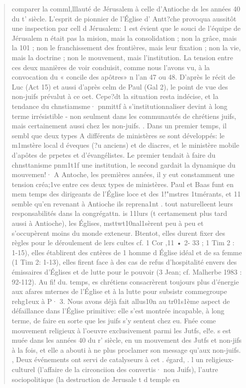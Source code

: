 \begin{quote}
    comparer la comml,lllauté de Jérusalem à celle d'Antioche ds les
années 40 du t' siècle. L'esprit de pionnier de l'Église d' Antt?che
provoqua aussitôt une inspection par cell d Jérusalem: 1 est évient
que le souci de l'équipe de Jérusalem n était pas la mision, mais la
consolidation ; non la grâce, mais la 101 ; non le franchissement des
frontières, mais leur fixation ; non la vie, mais la doctrine ; non le
mouvement, mais l'institution.
La tension entre ces deux manières de voir conduisit, comme nous
l'avons vu, à la convocation du « concile des apôtres» n l'an 47 ou
48. D'après le récit de Luc (Act 15) et aussi d'après celm de Paul (Gal
2), le point de vue des non-juifs prévalut à ce oet. Cepe?dt la
situation resta indécise, et la tendance du chnstiamsme· pnmittf à
s'institutionnaliser devint à long terme irrésistible - non seulment
dans les communautés de chrétiens juifs, mais certainement aussi chez
les non-juifs. .
Dans un premier temps, il sembl que deux types A différents de
ministères se sont développés: le m1mstère local d éveques (?u anciens)
et de diacres, et le ministère mobile d'apôtes de prpetes et
d'évangélistes. Le premier tendait à faire du chnsttanisme pnm1t1f une
institution, le second gardait la dynamique du mouvemen!· A Antoche,
les premières années, il y eut constamment une tension créa;1ve
entre ces deux types de ministères. Paul et Baas funt en mem
temps des dirigeants de l'Église loce et des 1!"mstres 1tmérants, et 11
semble qu'en revenant à Antioche ils reprena1nt . tout naturelleent
leurs responsabilités dans la congrégattn. is 11lurs (t certamement
plus tard aussi à Antioche), les Églises,  msttwt10nal1sèrent peu
à peu et s'occupèrent moins du monde exteneur. Btentot, elles durent
fixer des règles pour le déroulement de lers cultes cf. 1 Cor ,11 • 2-
33 ; 1 Tim 2 : 1-15), elles établirent des cntères de 1 homme d Église
idéal et de sa femme (1 Tim 2: 1-13), elles firent face à des cas de
refus d'hospitalité envers des émissaires d'Églises et de lutte pour le
pouvoir (3 Jean; cf. Malherbe 1983 : 92-112). Au fi! du. temps, es
chrétiens consacrèrent toujours plus d'énergie aux afares mternes de
l'Église et à la lutte pour subsistr commegroupe rehg1eux à P·
3. Nous avons déjà fait allus10n au tr01s1ème aspect de défaillance
dans l'Église primitive: elle s'est montrée incapable, à long terme, de
faire en sorte que les juifs s'y sentent chez eu. Fnée come
mouvement religieux à l'oeuvre exclusivement parmi les Jutfs, el!e. s est
muée dans les années 40 du r' siècle, en un mouvement des Jutfs et
non-jifs à la fois, et elle a abouti à ne plus proclamer son message
qu'aux non-juifs. ,
Deux événements ont servi de catalyseurs à cet . égard, . l un
religieux-culturel (l'affaire de la circonciion des convertis· non Juifs),
l'autre sociopolitique (la destruction de Jerusale t d temple en 
\end{quote}

